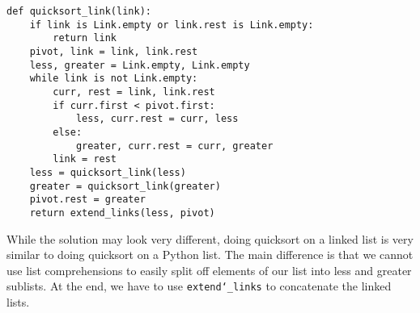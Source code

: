 \begin{solution}
\begin{lstlisting}
def quicksort_link(link):
    if link is Link.empty or link.rest is Link.empty:
        return link
    pivot, link = link, link.rest
    less, greater = Link.empty, Link.empty
    while link is not Link.empty:
        curr, rest = link, link.rest
        if curr.first < pivot.first:
            less, curr.rest = curr, less
        else:
            greater, curr.rest = curr, greater
        link = rest
    less = quicksort_link(less)
    greater = quicksort_link(greater)
    pivot.rest = greater
    return extend_links(less, pivot)
\end{lstlisting}

While the solution may look very different, doing quicksort on a linked list is
very similar to doing quicksort on a Python list. The main difference is that we
cannot use list comprehensions to easily split off elements of our list into
less and greater sublists. At the end, we have to use
\texttt{extend\char`_links} to concatenate the linked lists.

\end{solution}
